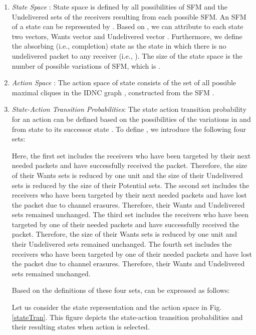 \documentclass[12pt, peerreview, onecolumn]{IEEEtran}
\begin{document}
\begin{enumerate}
\item \emph{State Space} : State space  is  defined by all possibilities of SFM  and  the Undelivered  sets of the   receivers  resulting from each possible SFM. An SFM of a  state   can be represented by  . Based on  , we can attribute to  each state    two vectors,  Wants  vector    and Undelivered vector . Furthermore, we define the  absorbing (i.e., completion)  state  as the state in which there is no undelivered packet to any receiver (i.e., ). The size of the  state space is the number of possible variations of SFM, which is .

\item \emph{Action Space} : The action space  of  state  consists of the set of  all  possible maximal cliques in the  IDNC graph , constructed from the SFM .


\item \emph{State-Action Transition Probabilities}: The state action transition probability  for an action  can be defined based on the possibilities of the variations in  and   from state  to its successor state . To define  , we  introduce the following four sets:
    
    
    
    

    Here, the first set  includes the receivers who have been targeted by their next needed packets and have successfully received the packet. Therefore,  the size of their Wants sets is reduced  by one unit and the size of their Undelivered sets is reduced  by  the size of their Potential sets. The second set  includes the receivers who have been targeted by their next needed packets and have lost the packet due to channel erasures. Therefore,  their Wants  and  Undelivered sets  remained unchanged. The third set  includes the receivers who have been targeted  by one of their needed packets  and have successfully received the packet. Therefore, the size of their Wants sets is reduced by one unit and their Undelivered sets  remained unchanged. The fourth set  includes the receivers who have been targeted  by  one of their needed packets  and have lost the packet  due to channel erasures.  Therefore, their Wants  and Undelivered sets   remained unchanged.


     Based on the definitions of these four sets,   can be expressed as follows:
    

\begin{examples}
Let us consider  the state representation and the action space  in Fig. \ref{stateTran}. This figure depicts the state-action  transition probabilities and their resulting states when action  is selected.
\end{examples}


\end{enumerate}
\end{document}
